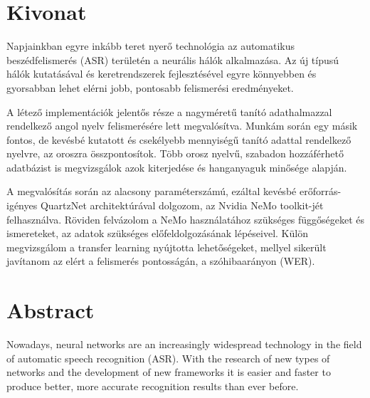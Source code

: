 \setcounter{page}{1}

\selecthungarian

\chapter*{Kivonat}

Napjainkban egyre inkább teret nyerő technológia az automatikus beszédfelismerés (ASR) területén a neurális hálók alkalmazása. Az új típusú hálók kutatásával és keretrendszerek fejlesztésével egyre könnyebben és gyorsabban lehet elérni jobb, pontosabb felismerési eredményeket.

A létező implementációk jelentős része a nagyméretű tanító adathalmazzal rendelkező angol nyelv felismerésére lett megvalósítva. Munkám során egy másik fontos, de kevésbé kutatott és csekélyebb mennyiségű tanító adattal rendelkező nyelvre, az oroszra összpontosítok. Több orosz nyelvű, szabadon hozzáférhető adatbázist is megvizsgálok azok kiterjedése és hanganyaguk minősége alapján.

A megvalósítás során az alacsony paraméterszámú, ezáltal kevésbé erőforrás-igényes QuartzNet architektúrával dolgozom, az Nvidia NeMo toolkit-jét felhasználva. Röviden felvázolom a NeMo használatához szükséges függőségeket és ismereteket, az adatok szükséges előfeldolgozásának lépéseivel. Külön megvizsgálom a transfer learning nyújtotta lehetőségeket, mellyel sikerült javítanom az elért a felismerés pontosságán, a szóhibaarányon (WER).

\vfill
\selectenglish


\chapter*{Abstract}

Nowadays, neural networks are an increasingly widespread technology in the field of automatic speech recognition (ASR). With the research of new types of networks and the development of new frameworks it is easier and faster to produce better, more accurate recognition results than ever before.

